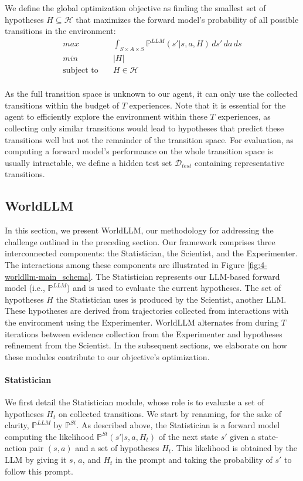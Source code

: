 \documentclass{article}
\begin{document}
We define the global optimization objective as finding the smallest set of hypotheses $H \subseteq \mathcal{H}$ that maximizes the forward model's probability of all possible transitions in the environment:
\begin{equation}
\begin{split}
max & \quad \int_{S\times A\times S} \mathbb{P}^{LLM}(s'|s,a,H) \,ds'\,da\,ds \\
min & \quad |H| \\
\text{subject to} & \quad H \in \mathcal{H} \\
\end{split}
\label{eq:4-worldllm-objective}
\end{equation}

As the full transition space is unknown to our agent, it can only use the collected transitions within the budget of $T$ experiences. Note that it is essential for the agent to efficiently explore the environment within these $T$ experiences, as collecting only similar transitions would lead to hypotheses that predict these transitions well but not the remainder of the transition space. For evaluation, as computing a forward model's performance on the whole transition space is usually intractable, we define a hidden test set $\mathcal{D}_{test}$ containing representative transitions.

\subsection{WorldLLM}
In this section, we present WorldLLM, our methodology for addressing the challenge outlined in the preceding section. Our framework comprises three interconnected components: the Statistician, the Scientist, and the Experimenter. The interactions among these components are illustrated in Figure \ref{fig:4-worldllm-main_schema}. 
The Statistician represents our LLM-based forward model (i.e., $\mathbb{P}^{LLM}$) and is used to evaluate the  current hypotheses. The set of hypotheses $H$ the Statistician uses is produced by the Scientist, another LLM. These hypotheses are derived from trajectories collected from interactions with the environment using the Experimenter. WorldLLM alternates from during $T$ iterations between evidence collection from the Experimenter and hypotheses refinement from the Scientist. In the subsequent sections, we elaborate on how these modules contribute to our objective's optimization.

\paragraph{Statistician}
We first detail the Statistician module, whose role is to evaluate a set of hypotheses $H_t$ on collected transitions. We start by renaming, for the sake of clarity, $\mathbb{P}^{LLM}$ by $\mathbb{P}^{St}$. As described above, the Statistician is a forward model computing the likelihood $\mathbb{P}^{St}(s'|s,a,H_t)$ of the next state $s'$ given a state-action pair $(s,a)$ and a set of hypotheses $H_t$. This likelihood is obtained by the LLM by giving it $s$, $a$, and $H_t$ in the prompt and taking the probability of $s'$ to follow this prompt.
\end{document}
